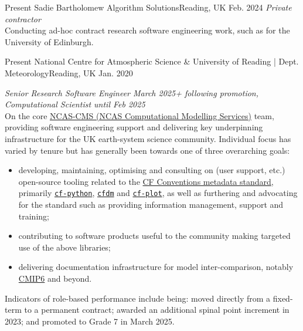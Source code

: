 
\begin{experiences}

 \researchexperience
    {Present} {Sadie Bartholomew Algorithm Solutions}{Reading, UK}{}
    {Feb. 2024} {\textit{Private contractor}\\
    Conducting ad-hoc contract research software engineering work, such as for the University of Edinburgh.
    }
    
\emptySeparator
\researchexperience
    {Present} {National Centre for Atmospheric Science \& University of Reading | Dept. Meteorology}{Reading, UK}{}
    {Jan. 2020} {\textit{Senior Research Software Engineer \lbrack March 2025+ following promotion\rbrack, Computational Scientist \lbrack until Feb 2025\rbrack}\\
    On the core \href{https://cms.ncas.ac.uk/index.html}{NCAS-CMS (NCAS Computational Modelling Services)} team, providing software engineering support and delivering key underpinning infrastructure for the UK earth-system science community. Individual focus has varied by tenure but has generally been towards one of three overarching goals:
    \begin{itemize}
        \itemsep0em 
        \item developing, maintaining, optimising and consulting on (user support, etc.) open-source tooling related to the \href{https://cfconventions.org/}{CF Conventions metadata standard}, primarily \href{https://github.com/NCAS-CMS/cf-python}{\texttt{cf-python}}, \href{https://github.com/NCAS-CMS/cfdm}{\texttt{cfdm}} and \href{https://github.com/NCAS-CMS/cf-plot}{\texttt{cf-plot}}, as well as furthering and advocating for the standard such as providing information management, support and training;
        \item contributing to software products useful to the community making targeted use of the above libraries;
        \item delivering documentation infrastructure for model inter-comparison, notably \href{https://wcrp-cmip.org/cmip6/}{CMIP6} and beyond.
    \end{itemize}
    Indicators of role-based performance include being: moved directly from a fixed-term to a permanent contract;  awarded an additional spinal point increment in 2023; and promoted to Grade 7 in March 2025.
    
    \vskip 0.1cm
    }


\end{experiences}
